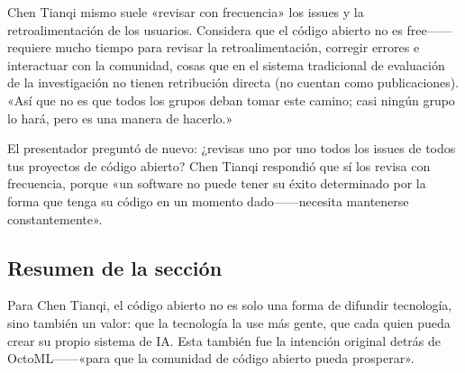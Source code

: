 Chen Tianqi mismo suele «revisar con frecuencia» los issues y la retroalimentación de los usuarios. Considera que el código abierto no es free------requiere mucho tiempo para revisar la retroalimentación, corregir errores e interactuar con la comunidad, cosas que en el sistema tradicional de evaluación de la investigación no tienen retribución directa (no cuentan como publicaciones). «Así que no es que todos los grupos deban tomar este camino; casi ningún grupo lo hará, pero es una manera de hacerlo.»

El presentador preguntó de nuevo: ¿revisas uno por uno todos los issues de todos tus proyectos de código abierto? Chen Tianqi respondió que sí los revisa con frecuencia, porque «un software no puede tener su éxito determinado por la forma que tenga su código en un momento dado------necesita mantenerse constantemente».

\subsection{Resumen de la sección}

Para Chen Tianqi, el código abierto no es solo una forma de difundir tecnología, sino también un valor: que la tecnología la use más gente, que cada quien pueda crear su propio sistema de IA. Esta también fue la intención original detrás de OctoML------«para que la comunidad de código abierto pueda prosperar».
